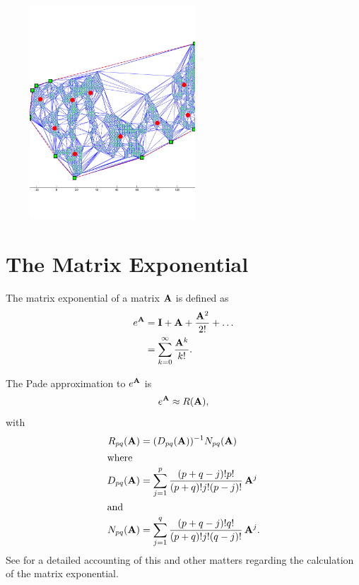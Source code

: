 \includegraphics[width=8.0cm,height=8.0cm]{Figures/ClusteringRW/rw_10000_delauney_kmens_convex_hull.pdf}


\section*{The Matrix Exponential}
The matrix exponential of a matrix $\mathbf{A}$ is defined as
\begin{align*}
  e^{\mathbf{A}}
  &= \mathbf{I} + \mathbf{A} + \frac{\mathbf{A}^2}{2!} + \dots \\
  &= \sum_{k = 0}^\infty \frac{\mathbf{A}^k}{k!}.
\end{align*}

The Pade approximation to
$e^{\mathbf{A}}$ is
\begin{displaymath}
  e^{\mathbf{A}} \approx R(\mathbf{A}),
\end{displaymath}
with
\begin{align*}
  R_{pq} (\mathbf{A})
  &= (D_{pq}(\mathbf{A}))^{-1} N_{pq}(\mathbf{A}) \\
  \intertext{where}
  D_{pq}(\mathbf{A})
  &= \sum_{j=1}^p \frac{(p+q-j)! p!}{ (p+q)!j!(p-j)!}\, \mathbf{A}^j \\
  \intertext{and}
  N_{pq}(\mathbf{A})
  &= \sum_{j=1}^q \frac{(p+q-j)! q!}{ (p+q)!j!(q-j)!}\, \mathbf{A}^j.
\end{align*}
See \cite{Moler78nineteendubious} for a detailed accounting of this and other matters regarding the calculation of the matrix exponential.
